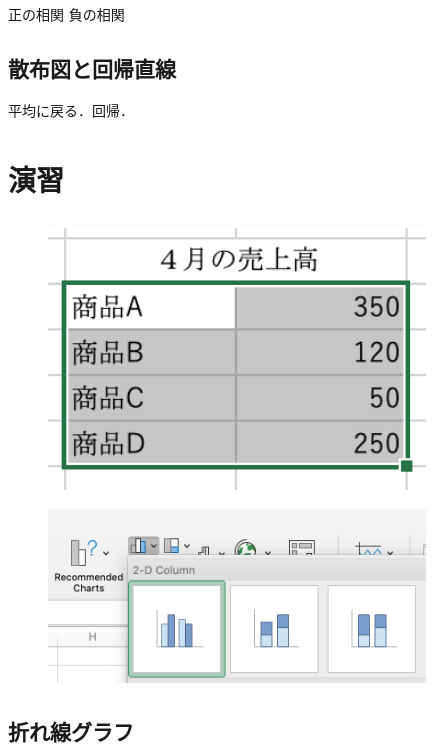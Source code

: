 \documentclass[12pt, a4j]{jsreport}
\begin{document}
正の相関
負の相関

\subsection{散布図と回帰直線}

平均に戻る．回帰．


\section{演習}

\subsection{}

\begin{figure}[htbp]
  \includegraphics[width=10cm]{bar1.png}
  \caption{}
  \label{fig:bar1}
\end{figure}

\begin{figure}[htbp]
  \includegraphics[width=10cm]{bar2.png}
  \caption{}
  \label{fig:bar2}
\end{figure}


\subsection{折れ線グラフ}
\end{document}
